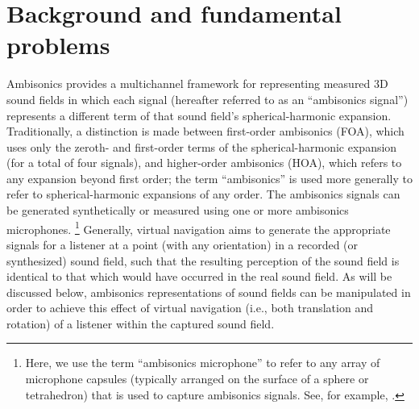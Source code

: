 \section{Background and fundamental problems}\label{sec:01_Introduction:Background}
Ambisonics provides a multichannel framework for representing measured 3D sound fields in which each signal (hereafter referred to as an ``ambisonics signal'') represents a different term of that sound field's spherical-harmonic expansion.
Traditionally, a distinction is made between first-order ambisonics (FOA), which uses only the zeroth- and first-order terms of the spherical-harmonic expansion (for a total of four signals), and higher-order ambisonics (HOA), which refers to any expansion beyond first order; the term ``ambisonics'' is used more generally to refer to spherical-harmonic expansions of any order.
The ambisonics signals can be generated synthetically or measured using one or more ambisonics microphones.%
\footnote{Here, we use the term ``ambisonics microphone'' to refer to any array of microphone capsules (typically arranged on the surface of a sphere or tetrahedron) that is used to capture ambisonics signals.
See, for example, .}
Generally, virtual navigation aims to generate the appropriate signals for a listener at a point (with any orientation) in a recorded (or synthesized) sound field, such that the resulting perception of the sound field is identical to that which would have occurred in the real sound field.
As will be discussed below, ambisonics representations of sound fields can be manipulated in order to achieve this effect of virtual navigation (i.e., both translation and rotation) of a listener within the captured sound field.

